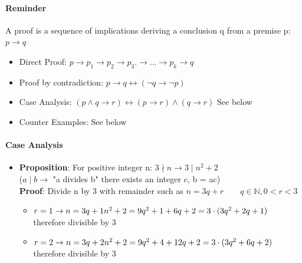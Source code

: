 \documentclass[9pt, letterpaper, oneside]{article}
\newcommand*\dbl{\leftrightarrow}
\begin{document}
\paragraph{Reminder}

A proof is a sequence of implications deriving a conclusion q from a premise p: $p \to q$

\begin{itemize}
\item Direct Proof: $p \to p_1 \to p_2 \to p_3 .\to ... \to p_k \to q$
\item Proof by contradiction: $p \to q \dbl (\neg q \to \neg p)$
\item Case Analysis: $(p \wedge q \to r) \dbl (p \to r) \wedge (q \to r)$ See below
\item Counter Examples: See below
\end{itemize}

\paragraph{Case Analysis}
\begin{itemize}
\item \textbf{Proposition}: For positive integer n: $3 \nmid n \to 3 \mid n^2 + 2$\\
	($a\mid b \to$ "a divides b" there exists an integer c, b = ac)\\
	\textbf{Proof}: Divide n by 3 with remainder such as $n = 3q + r \qquad q \in \mathbb{N}, 0 < r < 3$
	\begin{itemize}
		\item $r = 1 \to n = 3q + 1 \\ n^2 + 2 = 9q^2 + 1 + 6q + 2 = 3 \cdot (3q^2 + 2q + 1)$ \\ therefore divisible by 3  
		\item $r = 2 \to n = 3q + 2 \\ n^2 + 2 = 9q^2 + 4 + 12q + 2 = 3 \cdot (3q^2 + 6q + 2)$ \\ therefore divisible by 3  
	\end{itemize}
\end{itemize}
\end{document}
